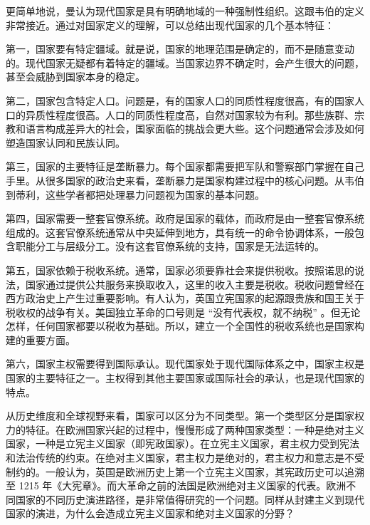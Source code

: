 更简单地说，曼认为现代国家是具有明确地域的一种强制性组织。这跟韦伯的定义非常接近。通过对国家定义的理解，可以总结出现代国家的几个基本特征：

第一，国家要有特定疆域。就是说，国家的地理范围是确定的，而不是随意变动的。现代国家无疑都有着特定的疆域。当国家边界不确定时，会产生很大的问题，甚至会威胁到国家本身的稳定。

第二，国家包含特定人口。问题是，有的国家人口的同质性程度很高，有的国家人口的异质性程度很高。人口的同质性程度高，自然对国家较为有利。那些族群、宗教和语言构成差异大的社会，国家面临的挑战会更大些。这个问题通常会涉及如何塑造国家认同和民族认同。

第三，国家的主要特征是垄断暴力。每个国家都需要把军队和警察部门掌握在自己手里。从很多国家的政治史来看，垄断暴力是国家构建过程中的核心问题。从韦伯到蒂利，这些学者都把处理暴力问题视为国家的基本问题。

第四，国家需要一整套官僚系统。政府是国家的载体，而政府是由一整套官僚系统组成的。这套官僚系统通常从中央延伸到地方，具有统一的命令协调体系，一般包含职能分工与层级分工。没有这套官僚系统的支持，国家是无法运转的。

第五，国家依赖于税收系统。通常，国家必须要靠社会来提供税收。按照诺思的说法，国家通过提供公共服务来换取收入，这里的收入主要是税收。税收问题曾经在西方政治史上产生过重要影响。有人认为，英国立宪国家的起源跟贵族和国王关于税收权的战争有关。美国独立革命的口号则是 “没有代表权，就不纳税” 。但无论怎样，任何国家都要以税收为基础。所以，建立一个全国性的税收系统也是国家构建的重要方面。

第六，国家主权需要得到国际承认。现代国家处于现代国际体系之中，国家主权是国家的主要特征之一。主权得到其他主要国家或国际社会的承认，也是现代国家的特点。

从历史维度和全球视野来看，国家可以区分为不同类型。第一个类型区分是国家权力的特征。在欧洲国家兴起的过程中，慢慢形成了两种国家类型：一种是绝对主义国家，一种是立宪主义国家（即宪政国家）。在立宪主义国家，君主权力受到宪法和法治传统的约束。在绝对主义国家，君主权力是绝对的，君主权力和意志是不受制约的。一般认为，英国是欧洲历史上第一个立宪主义国家，其宪政历史可以追溯至 1215 年《大宪章》。而大革命之前的法国是欧洲绝对主义国家的代表。欧洲不同国家的不同历史演进路径，是非常值得研究的一个问题。同样从封建主义到现代国家的演进，为什么会造成立宪主义国家和绝对主义国家的分野？

